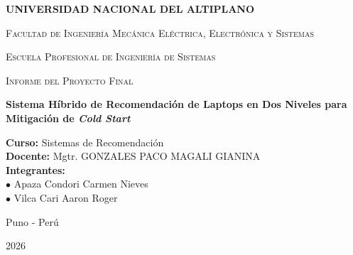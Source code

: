 \documentclass[12pt,a4paper]{report}
\begin{document}
\begin{titlepage}
    \centering
    {\bfseries\LARGE UNIVERSIDAD NACIONAL DEL ALTIPLANO \par}
    \vspace{0.5cm}
    {\scshape\Large Facultad de Ingeniería Mecánica Eléctrica, Electrónica y Sistemas \par}
    \vspace{0.3cm}
    {\scshape\large Escuela Profesional de Ingeniería de Sistemas \par}
    
    \vspace{1.5cm}
    
    \vspace{1.5cm}
    {\scshape\Large Informe del Proyecto Final \par}
    \vspace{0.5cm}
    {\huge\bfseries Sistema Híbrido de Recomendación de Laptops en Dos Niveles para Mitigación de \textit{Cold Start} \par}
    
    \vspace{2cm}
    \begin{flushleft}
        \large
        \textbf{Curso:} Sistemas de Recomendación \\
        \textbf{Docente:} Mgtr. GONZALES PACO MAGALI GIANINA \\
        \vspace{0.5cm}
        \textbf{Integrantes:}\\
        \indent $\bullet$ Apaza Condori Carmen Nieves \\
        \indent $\bullet$ Vilca Cari Aaron Roger
    \end{flushleft}
    
    \vfill
    {\large Puno - Perú \par}
    {\large 2026 \par}
\end{titlepage}
\end{document}
